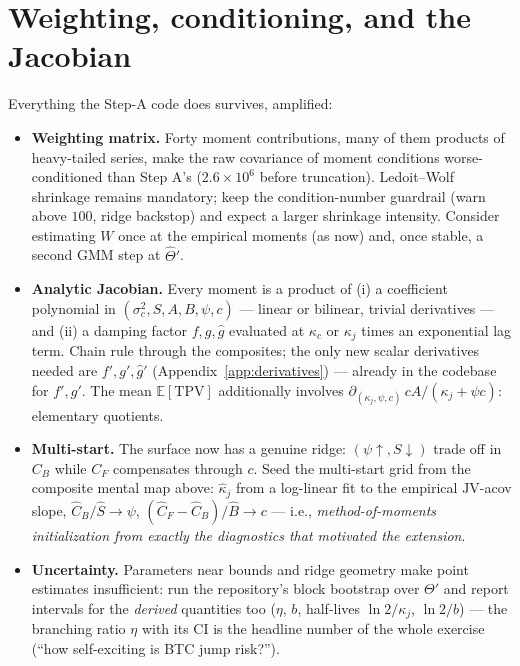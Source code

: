 \documentclass[11pt]{report}
\theoremstyle{definition}
\theoremstyle{remark}
\newcommand{\E}{\mathbb{E}}
\newcommand{\TPV}{\mathrm{TPV}}
\newcommand{\JV}{\mathrm{JV}}
\begin{document}
\section{Weighting, conditioning, and the Jacobian}

Everything the Step-A code does survives, amplified:
\begin{itemize}
\item \textbf{Weighting matrix.} Forty moment contributions, many of them
products of heavy-tailed series, make the raw covariance of moment
conditions worse-conditioned than Step A's ($2.6\times10^{6}$ before
truncation). Ledoit--Wolf shrinkage remains mandatory; keep the
condition-number guardrail (warn above $100$, ridge backstop) and expect a
larger shrinkage intensity. Consider estimating $W$ once at the empirical
moments (as now) and, once stable, a second GMM step at $\hat\Theta'$.
\item \textbf{Analytic Jacobian.} Every moment is a product of (i) a
coefficient polynomial in $(\sigma_c^2,S,A,B,\psi,c)$ --- linear or
bilinear, trivial derivatives --- and (ii) a damping factor
$f,g,\hat g$ evaluated at $\kappa_{c}$ or $\kappa_{j}$ times an exponential
lag term. Chain rule through the composites; the only new scalar derivatives
needed are $f',g',\hat g'$ (Appendix~\ref{app:derivatives}) --- already in
the codebase for $f',g'$. The mean $\E[\TPV]$ additionally involves
$\partial_{(\kappa_j,\psi,c)}\,cA/(\kappa_{j}+\psi c)$: elementary
quotients.
\item \textbf{Multi-start.} The surface now has a genuine ridge:
$(\psi\uparrow, S\downarrow)$ trade off in $C_{B}$ while
$C_{F}$ compensates through $c$. Seed the multi-start grid from the
composite mental map above: $\hat\kappa_{j}$ from a log-linear fit to the
empirical $\JV$-acov slope, $\hat C_{B}/\hat S\to\psi$,
$(\hat C_{F}-\hat C_{B})/\hat B\to c$ --- i.e., \emph{method-of-moments
initialization from exactly the diagnostics that motivated the extension}.
\item \textbf{Uncertainty.} Parameters near bounds and ridge geometry make
point estimates insufficient: run the repository's block bootstrap over
$\Theta'$ and report intervals for the \emph{derived} quantities too
($\eta$, $b$, half-lives $\ln 2/\kappa_{j}$, $\ln 2/b$) --- the branching
ratio $\eta$ with its CI is the headline number of the whole exercise
(``how self-exciting is BTC jump risk?'').
\end{itemize}

\end{document}
